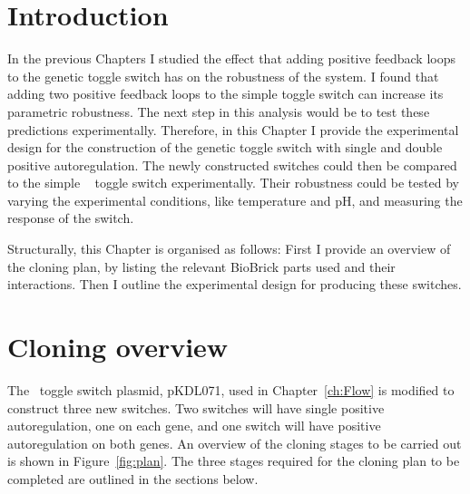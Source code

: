 
\section{Introduction}

In the previous Chapters I studied the effect that adding positive feedback loops to the genetic toggle switch has on the robustness of the system. I found that adding two positive feedback loops to the simple toggle switch can increase its parametric robustness. The next step in this analysis would be to test these predictions experimentally. Therefore, in this Chapter I provide the experimental design for the construction of the genetic toggle switch with single and double positive autoregulation. The newly constructed switches could then be compared to the simple ~\textcite{Litcofsky:2012gr} toggle switch experimentally. Their robustness could be tested by varying the experimental conditions, like temperature and pH, and measuring the response of the switch.

Structurally, this Chapter is organised as follows: First I provide an overview of the cloning plan, by listing the relevant BioBrick parts used and their interactions. Then I outline the experimental design for producing these switches.


\section{Cloning overview}

The~\textcite{Litcofsky:2012gr} toggle switch plasmid, pKDL071, used in Chapter~\ref{ch:Flow} is modified to construct three new switches. Two switches will have single positive autoregulation, one on each gene, and one switch will have positive autoregulation on both genes. An overview of the cloning stages to be carried out is shown in Figure~\ref{fig:plan}. The three stages required for the cloning plan to be completed are outlined in the sections below. 

